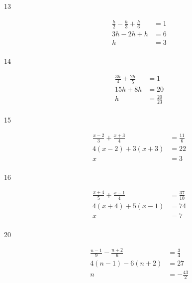\documentclass[letterpaper]{exam}
\begin{document}
\begin{description}
      \item[13] 
        \begin{align*}
          \frac{h}{2} - \frac{h}{3} + \frac{h}{6} & = 1 \\
          3h - 2h + h                             & = 6 \\
          h                                       & = \boxed{ 3 } \\
        \end{align*}

      \item[14] 
        \begin{align*}
          \frac{3h}{4} + \frac{2h}{5} & = 1 \\
          15h + 8h                    & = 20 \\
          h                           & = \boxed{ \frac{20}{23} } \\
        \end{align*}

      \item[15] 
        \begin{align*}
          \frac{x - 2}{3} + \frac{x + 3}{4} & = \frac{11}{6} \\
          4(x - 2) + 3(x + 3)               & = 22 \\
          x                                 & = \boxed{ 3 } \\
        \end{align*}

      \item[16] 
        \begin{align*}
          \frac{x + 4}{5} + \frac{x - 1}{4} & = \frac{37}{10} \\
          4 (x + 4) + 5 (x - 1)             & = 74 \\
          x                                 & = \boxed{ 7 } \\
        \end{align*}

      \item[20] 
        \begin{align*}
          \frac{n - 1}{9} - \frac{n + 2}{6}            & = \frac{3}{4} \\
          4(n - 1) - 6(n + 2)                          & = 27 \\
          n                                            & = \boxed{ - \frac{43}{2} } \\
        \end{align*}


\end{description}
\end{document}
